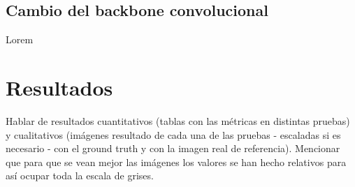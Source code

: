 \documentclass[a4paper, 11pt]{article}
\begin{document}
\subsection{Cambio del backbone convolucional}
Lorem



\clearpage
\section{Resultados}

Hablar de resultados cuantitativos (tablas con las métricas en distintas pruebas) y cualitativos (imágenes resultado de cada una de las pruebas - escaladas si es necesario - con el ground truth y con la imagen real de referencia). Mencionar que para que se vean mejor las imágenes los valores se han hecho relativos para así ocupar toda la escala de grises.
\end{document}
